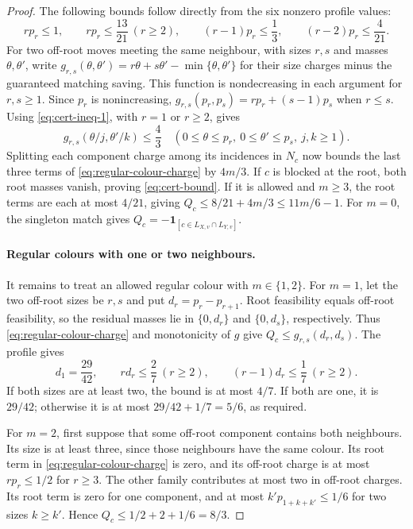 \documentclass[11pt,reqno]{article}
\theoremstyle{plain}
\theoremstyle{definition}
\theoremstyle{remark}
\theoremstyle{definition}
\theoremstyle{remark}
\newcommand{\one}[1]{\mathbf{1}_{\left[#1\right]}}   %
\begin{document}
\begin{proof}
The following bounds follow directly from the six nonzero profile values:
\begin{equation}\label{eq:cert-ineq-1}
  rp_r\le1,\qquad
  rp_r\le\frac{13}{21}\ (r\ge2),\qquad
  (r-1)p_r\le\frac13,\qquad
  (r-2)p_r\le\frac4{21}.
\end{equation}
For two off-root moves meeting the same neighbour, with sizes \(r,s\)
and masses \(\theta,\theta'\), write
\(g_{r,s}(\theta,\theta')=r\theta+s\theta'-\min\{\theta,\theta'\}\) for their size charges minus the
guaranteed matching saving.  This function is nondecreasing in each
argument for \(r,s\ge1\).  Since \(p_r\) is nonincreasing,
\(g_{r,s}(p_r,p_s)=rp_r+(s-1)p_s\) when \(r\le s\).
Using \eqref{eq:cert-ineq-1}, with \(r=1\) or \(r\ge2\), gives
\begin{equation}\label{eq:cert-ineq-2}
  g_{r,s}(\theta/j,\theta'/k)\le\frac43
  \quad(0\le\theta\le p_r,\ 0\le\theta'\le p_s,\ j,k\ge1).
\end{equation}
Splitting each component charge among its incidences in \(N_c\) now
bounds the last three terms of \eqref{eq:regular-colour-charge} by
\(4m/3\).  If \(c\) is blocked at the root, both root masses vanish,
proving \eqref{eq:cert-bound}.  If it is allowed and \(m\ge3\), the
root terms are each at most \(4/21\), giving
\(Q_c\le8/21+4m/3\le11m/6-1\).  For \(m=0\), the singleton match
gives \(Q_c=-\one{c\in L_{X,v}\cap L_{Y,v}}\).

\paragraph{Regular colours with one or two neighbours.}
It remains to treat an allowed regular colour with \(m\in\{1,2\}\).
For \(m=1\), let the two off-root sizes be \(r,s\) and put
\(d_r=p_r-p_{r+1}\).  Root feasibility equals off-root feasibility,
so the residual masses lie in \(\{0,d_r\}\) and \(\{0,d_s\}\), respectively.
Thus \eqref{eq:regular-colour-charge} and monotonicity of \(g\) give
\(Q_c\le g_{r,s}(d_r,d_s)\).  The profile gives
\[
  d_1=\frac{29}{42},\qquad
  rd_r\le\frac27\ (r\ge2),\qquad
  (r-1)d_r\le\frac17\ (r\ge2).
\]
If both sizes are at least two, the bound is at most \(4/7\).
If both are one, it is \(29/42\); otherwise it is at most
\(29/42+1/7=5/6\), as required.

For \(m=2\), first suppose that some off-root component contains both
neighbours.  Its size is at least three, since those neighbours have the
same colour.  Its root term in \eqref{eq:regular-colour-charge} is zero,
and its off-root charge is at most \(rp_r\le1/2\) for \(r\ge3\).
The other family contributes at most two in off-root charges.  Its root
term is zero for one component, and at most \(k'p_{1+k+k'}\le1/6\) for
two sizes \(k\ge k'\).  Hence \(Q_c\le1/2+2+1/6=8/3\).


\end{proof}
\end{document}

